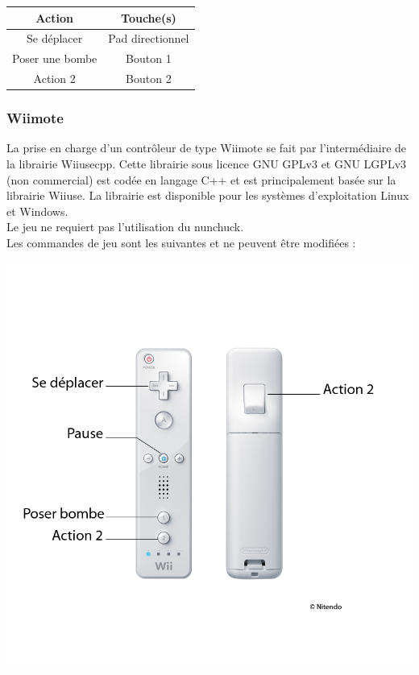 \begin{center}
	\begin{tabular}{|c|c|}
		\hline
			\rowcolor{blueTab}
			\textbf{Action} & \textbf{Touche(s)} \\
		\hline
		Se déplacer & Pad directionnel \\
		\hline
		Poser une bombe & Bouton 1\\
		\hline
		Action 2 & Bouton 2\\
		\hline
	\end{tabular}
\end{center}


\subsubsection{Wiimote}
La prise en charge d'un contrôleur de type Wiimote se fait par l'intermédiaire de la librairie Wiiusecpp. Cette librairie sous licence GNU GPLv3 et GNU LGPLv3 (non commercial) est codée en langage C++ et est principalement basée sur la librairie Wiiuse. La librairie est disponible pour les systèmes d'exploitation Linux et Windows.\\
Le jeu ne requiert pas l'utilisation du nunchuck.\\
Les commandes de jeu sont les suivantes et ne peuvent être modifiées :\\

\begin{center}
	\includegraphics[scale=1.7]{images/wiimote}
\end{center}